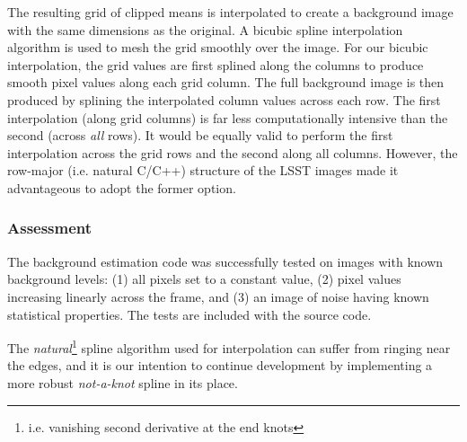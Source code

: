 
The resulting grid of clipped means is interpolated to create a
background image with the same dimensions as the original.  A bicubic
spline interpolation algorithm is used to mesh the grid smoothly over
the image.  For our bicubic interpolation, the
grid values are first splined along the columns to produce smooth
pixel values along each grid column.  The full background image is
then produced by splining the interpolated column values across each
row.  The first interpolation (along grid columns) is far less
computationally intensive than the second (across {\it all}
rows).  It would be equally valid to perform the first interpolation
across the grid rows and the second along all columns.  However, the
row-major (i.e. natural C/C++) structure of the LSST images made it
advantageous to adopt the former option.

\subsubsection{Assessment}

The background estimation code was successfully tested on images with
known background levels: (1) all pixels set to a constant value, (2)
pixel values increasing linearly across the frame, and (3) an image of
noise having known statistical properties.  The tests are included
with the source code.


The {\it natural}\footnote{i.e. vanishing second derivative at the end
knots} spline algorithm used for interpolation can suffer from
ringing near the edges, and it is our intention to continue
development by implementing a more robust {\it not-a-knot} spline in
its place.
